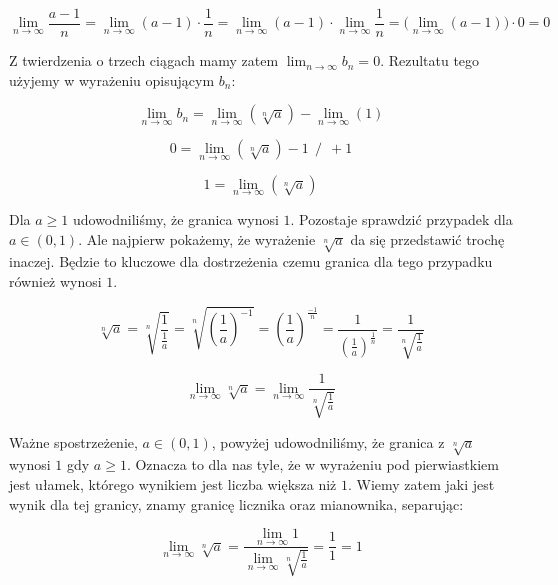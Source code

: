 \documentclass[a4paper,oneside,openright,11pt]{article}
\numberwithin{equation}{section}
\begin{document}
\begin{equation*}
    \lim_{n\to\infty} \frac{a - 1}{n} = \lim_{n\to\infty} (a-1) \cdot \frac{1}{n} = \lim_{n\to\infty} (a-1) \cdot  \lim_{n\to\infty} \frac{1}{n} = \big(\lim_{n\to\infty} (a-1)\big) \cdot 0 = 0
\end{equation*}

\noindent
Z twierdzenia o trzech ciągach mamy zatem $\lim_{n\to\infty} b_{n} = 0$. Rezultatu tego użyjemy w wyrażeniu opisującym $b_{n}$:

\begin{equation*}
    \lim_{n\to\infty} b_{n} = \lim_{n\to\infty}(\sqrt[n]{a}) - \lim_{n\to\infty}(1)
\end{equation*}

\begin{equation*}
    0 = \lim_{n\to\infty}(\sqrt[n]{a}) - 1 \ \ / \ \ +1
\end{equation*}

\begin{equation*}
    1 = \lim_{n\to\infty}(\sqrt[n]{a})
\end{equation*}

Dla $a \geq 1$ udowodniliśmy, że granica wynosi $1$. Pozostaje sprawdzić przypadek dla $a \in (0, 1)$. Ale najpierw pokażemy, że wyrażenie $\sqrt[n]{a}$ da się przedstawić trochę inaczej.
Będzie to kluczowe dla dostrzeżenia czemu granica dla tego przypadku również wynosi $1$.

\begin{equation*}
    \sqrt[n]{a} = \sqrt[n]{\frac{1}{\frac{1}{a}}} = \sqrt[n]{(\frac{1}{a})^{-1}} = (\frac{1}{a})^{\frac{-1}{n}} = \frac{1}{(\frac{1}{a})^{\frac{1}{n}}} = \frac{1}{\sqrt[n]{\frac{1}{a}}}
\end{equation*}

\begin{equation*}
    \lim_{n\to\infty}\sqrt[n]{a} = \lim_{n\to\infty}\frac{1}{\sqrt[n]{\frac{1}{a}}} 
\end{equation*}

Ważne spostrzeżenie, $a \in (0, 1)$, powyżej udowodniliśmy, że granica z $\sqrt[n]{a}$ wynosi $1$ gdy $a \geq 1$. Oznacza to dla nas tyle, że w wyrażeniu pod pierwiastkiem jest ułamek, którego wynikiem
jest liczba większa niż $1$. Wiemy zatem jaki jest wynik dla tej granicy, znamy granicę licznika oraz mianownika, separując:

\begin{equation*}
    \lim_{n\to\infty}\sqrt[n]{a} = \frac{\lim_{n\to\infty} 1}{\lim_{n\to\infty} \sqrt[n]{\frac{1}{a}}} = \frac{1}{1} = 1
\end{equation*}
\end{document}
